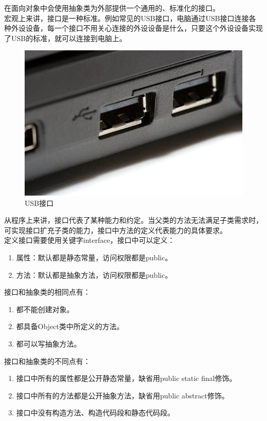 在面向对象中会使用抽象类为外部提供一个通用的、标准化的接口。\\

宏观上来讲，接口是一种标准。例如常见的USB接口，电脑通过USB接口连接各种外设设备，每一个接口不用关心连接的外设设备是什么，只要这个外设设备实现了USB的标准，就可以连接到电脑上。

\begin{figure}[H]
	\centering
	\includegraphics[scale=0.4]{img/C9/9-4/1.png}
	\caption{USB接口}
\end{figure}

从程序上来讲，接口代表了某种能力和约定。当父类的方法无法满足子类需求时，可实现接口扩充子类的能力，接口中方法的定义代表能力的具体要求。\\

定义接口需要使用关键字interface，接口中可以定义：

\begin{enumerate}
	\item 属性：默认都是静态常量，访问权限都是public。
	\item 方法：默认都是抽象方法，访问权限都是public。
\end{enumerate}

接口和抽象类的相同点有：

\begin{enumerate}
	\item 都不能创建对象。
	\item 都具备Object类中所定义的方法。
	\item 都可以写抽象方法。
\end{enumerate}

接口和抽象类的不同点有：

\begin{enumerate}
	\item 接口中所有的属性都是公开静态常量，缺省用public static final修饰。
	\item 接口中所有的方法都是公开抽象方法，缺省用public abstract修饰。
	\item 接口中没有构造方法、构造代码段和静态代码段。
\end{enumerate}

